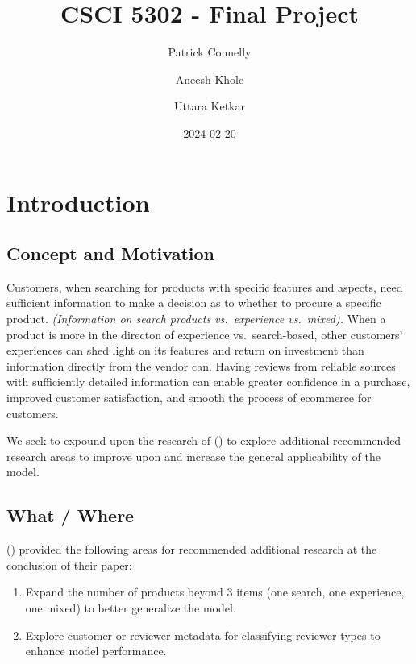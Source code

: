 \documentclass[
  letterpaper,
  DIV=11,
  numbers=noendperiod]{scrreprt}
\title{CSCI 5302 - Final Project}
\author{Patrick Connelly \and Aneesh Khole \and Uttara Ketkar}
\date{2024-02-20}
\renewcommand*\contentsname{Table of contents}
\newcommand\contentsname{Table of contents}
\begin{document}
\maketitle

\renewcommand*\contentsname{Table of contents}
{
\hypersetup{linkcolor=}
\setcounter{tocdepth}{2}
\tableofcontents
}

\chapter{Introduction}\label{sec-intro}

\section{Concept and Motivation}\label{concept-and-motivation}

Customers, when searching for products with specific features and
aspects, need sufficient information to make a decision as to whether to
procure a specific product. \emph{(Information on search products
vs.~experience vs.~mixed).} When a product is more in the directon of
experience vs.~search-based, other customers' experiences can shed light
on its features and return on investment than information directly from
the vendor can. Having reviews from reliable sources with sufficiently
detailed information can enable greater confidence in a purchase,
improved customer satisfaction, and smooth the process of ecommerce for
customers.

We seek to expound upon the research of
() to explore additional
recommended research areas to improve upon and increase the general
applicability of the model.

\section{What / Where}\label{what-where}

() provided the following areas
for recommended additional research at the conclusion of their paper:

\begin{enumerate}
\def\labelenumi{\arabic{enumi}.}
\item
  Expand the number of products beyond 3 items (one search, one
  experience, one mixed) to better generalize the model.
\item
  Explore customer or reviewer metadata for classifying reviewer types
  to enhance model performance.
\end{enumerate}
\end{document}
